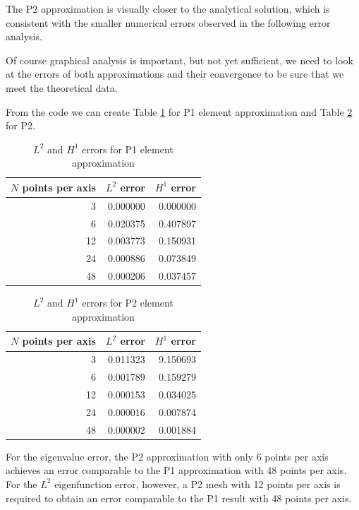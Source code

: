 \documentclass[acmsmall,screen]{MapleTrans}
\begin{document}
The P2 approximation is visually closer to the analytical solution, which is consistent with the smaller numerical errors observed in the following error analysis.

Of course graphical analysis is important, but not yet sufficient, we need to look at the errors of both approximations and their convergence to be sure that we meet the theoretical data.

From the code we can create Table \ref{tab:L2 and H1 error P1} for P1 element approximation and Table \ref{tab:L2 and H1 error P2} for P2.
\begin{table}[H]
    \centering
    \caption{$L^2$ and $H^1$ errors for P1 element approximation}
    \label{tab:L2 and H1 error P1}
    \begin{tabular}{rrr}
        \toprule
        $N$ points per axis & $L^2$ error & $H^1$ error \\
        \midrule
        3 & 0.000000 & 0.000000 \\
        6 & 0.020375 & 0.407897 \\
        12 & 0.003773 & 0.150931 \\
        24 & 0.000886 & 0.073849 \\
        48 & 0.000206 & 0.037457 \\
        \bottomrule
    \end{tabular}
\end{table}
\begin{table}[H]
    \centering
    \caption{$L^2$ and $H^1$ errors for P2 element approximation}
    \label{tab:L2 and H1 error P2}
    \begin{tabular}{rrr}
        \toprule
        $N$ points per axis & $L^2$ error & $H^1$ error \\
        \midrule
        3 & 0.011323 & 9.150693 \\
        6 & 0.001789 & 0.159279 \\
        12 & 0.000153 & 0.034025 \\
        24 & 0.000016 & 0.007874 \\
        48 & 0.000002 & 0.001884 \\
        \bottomrule
    \end{tabular}
\end{table}

For the eigenvalue error, the P2 approximation with only 6 points per axis achieves an error comparable to the P1 approximation with 48 points per axis. For the $L^2$ eigenfunction error, however, a P2 mesh with 12 points per axis is required to obtain an error comparable to the P1 result with 48 points per axis.
\end{document}
